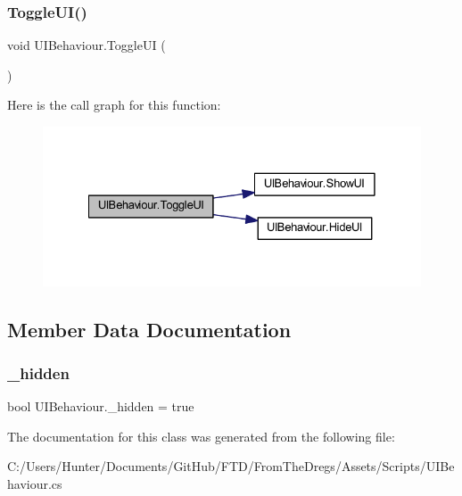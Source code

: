 \subsubsection{\texorpdfstring{ToggleUI()}{ToggleUI()}}
{\footnotesize\ttfamily void U\+I\+Behaviour.\+Toggle\+UI (\begin{DoxyParamCaption}{ }\end{DoxyParamCaption})}

Here is the call graph for this function\+:
\nopagebreak
\begin{figure}[H]
\begin{center}
\leavevmode
\includegraphics[width=328pt]{class_u_i_behaviour_a508b07927b86c1f75ab1eeb45674f040_cgraph}
\end{center}
\end{figure}


\subsection{Member Data Documentation}
\mbox{\label{class_u_i_behaviour_a0421d4dc2987f0c48b88cc6175d993e5}} 
\subsubsection{\texorpdfstring{\_hidden}{\_hidden}}
{\footnotesize\ttfamily bool U\+I\+Behaviour.\+\_\+hidden = true\hspace{0.3cm}{\ttfamily [protected]}}



The documentation for this class was generated from the following file\+:\begin{DoxyCompactItemize}
\item 
C\+:/\+Users/\+Hunter/\+Documents/\+Git\+Hub/\+F\+T\+D/\+From\+The\+Dregs/\+Assets/\+Scripts/U\+I\+Behaviour.\+cs\end{DoxyCompactItemize}
